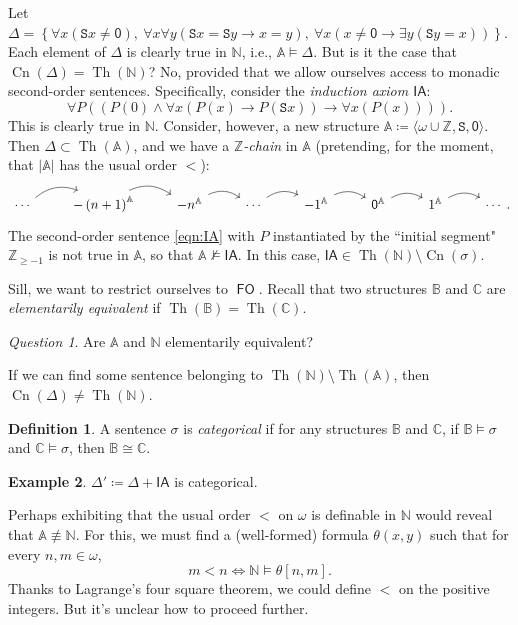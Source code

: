 \documentclass[10pt,letterpaper,cm]{nupset}
\theoremstyle{definition}
\newtheorem{definition}{Definition}[subsection]
\newtheorem{exmp}[definition]{Example}
\theoremstyle{theorem}
\theoremstyle{remark}
\newtheorem*{question}{Question}
\newcommand{\A}{\mathbb A}
\newcommand{\C}{\mathbb C}
\newcommand{\N}{\mathbb N}
\renewcommand{\S}{\mathtt S}
\newcommand{\Z}{\mathbb Z}
\newcommand{\B}{\mathbb{B}}
\newcommand{\1}{\mathbf{1}}
\newcommand{\0}{\mathsf 0}
\DeclareMathOperator{\fo}{\mathsf{FO}}
\DeclareMathOperator{\thh}{Th}
\DeclareMathOperator{\cn}{Cn}
\begin{document}
Let $\Delta = \left\{\forall{x}\left(\S{x}\ne \0\right), \ \forall{x}\forall{y}\left(\S{x} = \S{y} \rightarrow x =y\right), \ \forall{x}\left(x\ne \0 \rightarrow \exists{y}\left(\S{y}=x\right)\right)\right\}$. Each element of $\Delta$ is clearly true in $\N$, i.e., $\A \models \Delta$. But is it the case that $\cn(\Delta) = \thh(\N)$? No, provided that we allow ourselves access to monadic second-order sentences. Specifically, consider the \textit{induction axiom $\mathsf{IA}$}:
\[ \label{eqn:IA}
\forall{P}\left(\left(P(0) \land \forall{x}\left(P(x) \rightarrow P(\S{x})\right) \rightarrow \forall{x}\left(P(x)\right)\right)\right). \tag{$\ast$}
\] This is clearly true in $\N$. Consider, however, a new structure $\A \coloneqq \langle \omega \cup \Z, \S, \0\rangle$. Then $\Delta \subset \thh(\A)$, and we have a \textit{$\Z$-chain} in $\A$ (pretending, for the moment, that $\lvert{\A}\rvert$ has the usual order $<$):
\[
\begin{tikzcd}
\cdots \arrow[r, bend left] & {-\left(n+1\right)}^{\A} \arrow[r, bend left] & {-n}^{\A} \arrow[r, bend left] & \cdots \arrow[r, bend left] & {-1}^{\A} \arrow[r, bend left] & \0^{\A} \arrow[r, bend left] & 1^{\A} \arrow[r, bend left] & \cdots
\end{tikzcd}
.\] The second-order sentence \eqref{eqn:IA} with $P$ instantiated by the ``initial segment" $\Z_{\geq {-1}}$ is not true in $\A$, so that  $\A \not\models \mathsf{IA}$. In this case, $\mathsf{IA} \in \thh(\N)\setminus \cn(\sigma)$.

Sill, we want to restrict ourselves to $\fo$. Recall that two structures $\B$ and $\C$ are \textit{elementarily equivalent} if $\thh(\B) = \thh(\C)$. 

\begin{question}
Are $\A$ and $\N$ elementarily equivalent?
\end{question}

If we can find some sentence belonging to $\thh(\N)\setminus \thh(\A)$, then $\cn(\Delta) \ne \thh(\N)$.

\begin{definition}
A sentence $\sigma$ is \textit{categorical} if for any structures $\B$ and $\C$, if $\B \models \sigma$ and $\C \models \sigma$, then $\B \cong \C$.
\end{definition}

\begin{exmp}
$\Delta' \coloneqq \Delta +\mathsf{IA}$ is categorical.
\end{exmp}

Perhaps exhibiting that the usual order $<$ on $\omega$ is definable in $\N$ would reveal that $\A \not \equiv \N$. For this, we must find a (well-formed) formula $\theta(x,y)$ such that for every $n,m\in \omega$, $$m<n \iff \N \models \theta[n,m].$$
Thanks to Lagrange's four square theorem, we could define $<$ on the positive integers. But it's unclear how to proceed further.
\end{document}

